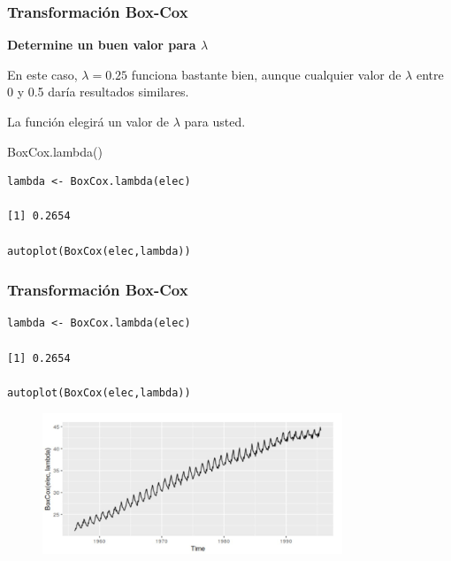 \documentclass[10pt]{beamer}
\begin{document}





\begin{frame}[fragile]
\frametitle{Transformación Box-Cox}

\textbf{Determine un buen valor para $\lambda$}

\vspace{4mm}

En este caso, $\lambda = 0.25$ funciona bastante bien, aunque cualquier valor de $\lambda$  entre 0 y 0.5 daría resultados similares.

\vspace{4mm}

La función  elegirá un valor de $\lambda$ para usted.

\begin{block}{BoxCox.lambda()}

\begin{lstlisting}
lambda <- BoxCox.lambda(elec)

[1] 0.2654

autoplot(BoxCox(elec,lambda))
\end{lstlisting}

\end{block}


\end{frame}







\begin{frame}[fragile]
\frametitle{Transformación Box-Cox}

\begin{lstlisting}
lambda <- BoxCox.lambda(elec)

[1] 0.2654

autoplot(BoxCox(elec,lambda))
\end{lstlisting}


\begin{figure}
\begin{center}
    \includegraphics[width=0.8\textwidth]{Imagen8.JPG}
\end{center}
\end{figure}

\end{frame}
\end{document}
